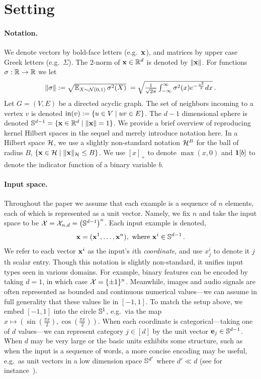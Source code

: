 \section{Setting}

\paragraph{Notation.} We denote
vectors by bold-face letters (e.g.\ ${\mathbf x}$), and
matrices by upper case Greek letters (e.g.\ $\Sigma$). The $2$-norm of ${\mathbf x}
\in {\mathbb R}^d$ is denoted by $\|{\mathbf x}\|$. For functions $\sigma:{\mathbb R}\to{\mathbb R}$
we let
$$
\|\sigma\| \textstyle
	:=\sqrt{\operatorname*{\mathbb{E}}_{X\sim{\cal N}(0,1)}\sigma^2(X)}
	\; = \sqrt{\frac{1}{\sqrt{2\pi}}
		\int_{-\infty}^\infty \sigma^2(x)e^{-\frac{x^2}{2}}dx} \,.
$$
%
Let $G=(V,E)$ be a directed acyclic graph. The set of neighbors incoming to
a vertex $v$ is denoted $\mathrm{in}(v):=\{u\in V\mid uv\in E\}$.
The $d-1$ dimensional sphere is denoted ${\mathbb S}^{d-1} =
\{{\mathbf x}\in{\mathbb R}^d \mid \|{\mathbf x}\|=1\}$. We provide a brief overview of
reproducing kernel Hilbert spaces in the sequel and merely introduce
notation here. In a Hilbert space ${\cal H}$, we use a slightly
non-standard notation ${\cal H}^B$ for the ball of radius $B$, $\{{\mathbf x} \in
{\cal H} \mid \|{\mathbf x}\|_{\cal H} \leq B\}$. We use $[x]_+$ to denote $\max(x,0)$
and $\mathbf{1}[b]$ to denote the indicator function of a binary variable
$b$.

\paragraph{Input space.} Throughout the paper we assume that each example is
a sequence of $n$ elements, each of which is represented as a unit vector. 
Namely, we fix $n$ and take the input space to be
	${\cal X}={\cal X}_{n,d}=\left({\mathbb S}^{d-1}\right)^n$.
Each input example is denoted,
\begin{align} \label{eq:coordinates}
	{\mathbf x}=({\mathbf x}^1,\ldots,{\mathbf x}^n), ~\text{where } {\mathbf x}^i\in {\mathbb S}^{d-1} \,.
\end{align}
%
We refer to each vector ${\mathbf x}^i$ as the input's $i$th {\em
  coordinate}, and use $x^i_{j}$ to denote it $j$th scalar
entry. Though this notation is slightly non-standard, it unifies 
input types seen in various domains. For example,
binary features can be encoded by taking $d=1$, in which case
${\cal X}=\{\pm 1\}^n$. Meanwhile, images and audio signals are often
represented as bounded and continuous numerical values---we can assume
in full generality that these values lie in $[-1,1]$. To match the setup
above, we embed $[-1,1]$ into the circle ${\mathbb S}^1$, e.g.\ via the map $x
\mapsto \left(\sin\left(\frac{\pi x}{2}\right), \cos\left(\frac{\pi
  x}{2}\right)\right)$. When each coordinate is categorical---taking
one of $d$ values---we can represent category $j\in[d]$ by the unit
vector $\mathbf e_j\in{\mathbb S}^{d-1}$. When $d$ may be very large or
the basic units exhibits some structure, such as when the input is a sequence
of words, a more concise encoding may be
useful, e.g.\ as unit vectors in a low dimension space ${\mathbb S}^{d'}$
where $d'\ll d$ (see for
instance~\citet{mikolov2013distributed,levy2014neural}).

